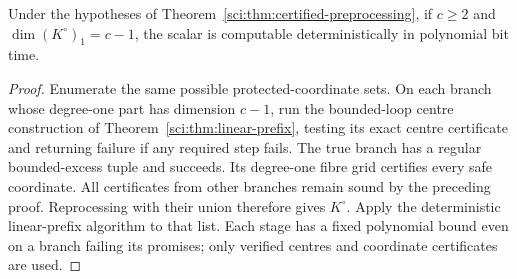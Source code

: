 \begin{corollary}
\label{sci:cor:certified-linear}
Under the hypotheses of Theorem~\ref{sci:thm:certified-preprocessing},
if $c\ge2$ and $\dim(K^\circ)_1=c-1$, the scalar is computable
deterministically in polynomial bit time.
\end{corollary}
\begin{proof}
Enumerate the same possible protected-coordinate sets. On each branch
whose degree-one part has dimension $c-1$, run the bounded-loop
centre construction of Theorem~\ref{sci:thm:linear-prefix}, testing
its exact centre certificate and returning failure if any required
step fails. The true branch has a regular bounded-excess tuple and
succeeds. Its degree-one fibre grid certifies every safe coordinate.
All certificates from other branches remain sound by the preceding
proof. Reprocessing with their union therefore gives $K^\circ$.
Apply the deterministic linear-prefix algorithm to that list. Each
stage has a fixed polynomial bound even on a branch failing its
promises; only verified centres and coordinate certificates are used.
\end{proof}

